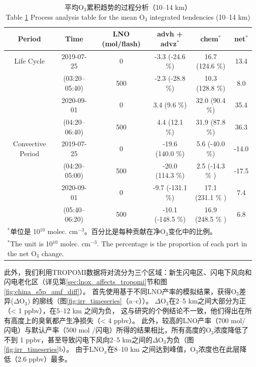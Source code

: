 \begin{table}[h]
\centering
\caption{平均O$_3$累积趋势的过程分析（10--14 km）\\ Table \ref{table:ipr} Process analysis table for the mean O$_3$ integrated tendencies (10--14 km)}
\begin{tabular}{@{\extracolsep{\fill}} cccccc}
\hline
  Period           & Time             & LNO (mol/flash) & advh + advz$^*$       & chem$^*$              & net$^*$    \\
\hline
Life Cycle         & 2019-07-25       & 0               & -3.3 (-24.6 \%)        & 16.7 (124.6 \%)        & 13.4       \\
                   & (03:20--05:40)   & 500             & -2.3 (-28.8 \%)        & 10.3 (128.8 \%)        & 8.0        \\
\cline{2-6}
                   & 2020-09-01       & 0               & 3.4  (9.6 \%)          & 32.0 (90.4 \%)         & 35.4       \\
                   & (04:20--06:40)   & 500             & 4.4  (12.1 \%)         & 31.9 (87.8 \%)         & 36.3       \\
\hline
Convective Period   & 2019-07-25      & 0              & -19.6 (140.0 \%)       & 5.6 (-40.0 \%)         & -14.0      \\
                    & (04:20--05:00)  & 500            & -20.0 (114.3 \%)       & 2.5 (-14.3 \% )        & -17.5      \\
\cline{2-6}
                    & 2020-09-01      & 0              & -9.7  (-131.1 \%)      & 17.1 (231.1 \% )       & 7.4        \\
                    & (05:40--06:20)  & 500            & -10.1 (-148.5 \%)      & 16.9 (248.5 \% )       & 6.8        \\
\hline
\multicolumn{6}{l}{$^{*}$单位是 10$^{10}$ molec. cm$^{-3}$。百分比是每种贡献在净O$_3$变化中的比例。} \\
\multicolumn{6}{l}{$^{*}$The unit is 10$^{10}$ molec. cm$^{-3}$. The percentage is the proportion of each part in the net O$_3$ change.}
\end{tabular}
\label{table:ipr}
\end{table}


此外，我们利用TROPOMI数据将对流分为三个区域：新生闪电区、闪电下风向和闪电老化区（详见第\ref{sec:lnox_affects_tropomi}节和图\ref{fig:china_s5p_amf_diff}）。
首先使用基于不同LNO产率的模拟结果，获得O$_3$差异($\Delta$O$_3$) 的廓线（图\ref{fig:irr_timeseries}（a--c））。
$\Delta$O$_3$在2--5 km之间大部分为正（< 1 ppbv），在5--12 km 之间为负，
这与\citet{Ott.2007}研究的个例结论不一致，他们得出在所有高度上的臭氧都产生净损失（< 4 ppbv）。
此外，较高的LNO产率（700 mol/闪电）与默认产率（500 mol /闪电）所得的结果相比，所有高度的O$_3$浓度降低了不到 1 ppbv，甚至导致闪电下风向2--5 km之间的$\Delta$O$_3$为负（图\ref{fig:irr_timeseries}b）。
由于LNO$_x$在8--10 km 之间达到峰值，O$_3$浓度也在此层降低（2.6 ppbv）最多。


